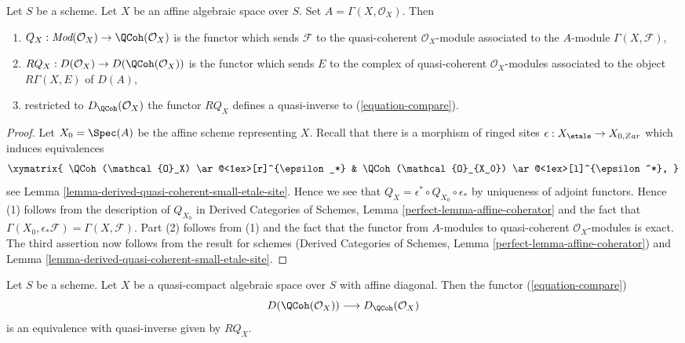 \begin{lemma}
\label{lemma-affine-coherator}
Let $S$ be a scheme. Let $X$ be an affine algebraic space over $S$.
Set $A = \Gamma(X, \mathcal{O}_X)$. Then
\begin{enumerate}
\item $Q_X : \textit{Mod}(\mathcal{O}_X) \to \QCoh(\mathcal{O}_X)$
is the functor
which sends $\mathcal{F}$ to the quasi-coherent $\mathcal{O}_X$-module
associated to the $A$-module $\Gamma(X, \mathcal{F})$,
\item $RQ_X : D(\mathcal{O}_X) \to D(\QCoh(\mathcal{O}_X))$
is the functor which sends $E$ to the complex of quasi-coherent
$\mathcal{O}_X$-modules associated to the object $R\Gamma(X, E)$ of $D(A)$,
\item restricted to $D_\QCoh(\mathcal{O}_X)$ the functor
$RQ_X$ defines a quasi-inverse to (\ref{equation-compare}).
\end{enumerate}
\end{lemma}

\begin{proof}
Let $X_0 = \Spec(A)$ be the affine scheme representing $X$.
Recall that there is a morphism of ringed sites
$\epsilon : X_\etale \to X_{0, Zar}$
which induces equivalences
$$
\xymatrix{
\QCoh(\mathcal{O}_X) \ar@<1ex>[r]^{\epsilon_*} &
\QCoh(\mathcal{O}_{X_0}) \ar@<1ex>[l]^{\epsilon^*},
}
$$
see Lemma
\ref{lemma-derived-quasi-coherent-small-etale-site}.
Hence we see that $Q_X = \epsilon^* \circ Q_{X_0} \circ \epsilon_*$
by uniqueness of adjoint functors. Hence (1) follows from
the description of $Q_{X_0}$ in
Derived Categories of Schemes, Lemma \ref{perfect-lemma-affine-coherator}
and the fact that
$\Gamma(X_0, \epsilon_*\mathcal{F}) = \Gamma(X, \mathcal{F})$.
Part (2) follows from (1) and the fact that the functor
from $A$-modules to quasi-coherent $\mathcal{O}_X$-modules is exact.
The third assertion now follows from the result for schemes
(Derived Categories of Schemes, Lemma \ref{perfect-lemma-affine-coherator})
and Lemma
\ref{lemma-derived-quasi-coherent-small-etale-site}.
\end{proof}

\begin{proposition}
\label{proposition-quasi-compact-affine-diagonal}
Let $S$ be a scheme. Let $X$ be a quasi-compact algebraic space over $S$
with affine diagonal. Then the functor (\ref{equation-compare})
$$
D(\QCoh(\mathcal{O}_X))
\longrightarrow
D_\QCoh(\mathcal{O}_X)
$$
is an equivalence with quasi-inverse given by $RQ_X$.
\end{proposition}

